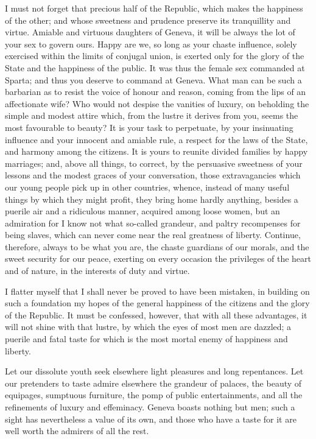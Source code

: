 \documentclass[12pt]{report}
\begin{document}
I must not forget that precious half of the Republic, which makes the happiness of the other; and whose sweetness and prudence preserve its tranquillity and virtue. Amiable and virtuous daughters of Geneva, it will be always the lot of your sex to govern ours. Happy are we, so long as your chaste influence, solely exercised within the limits of conjugal union, is exerted only for the glory of the State and the happiness of the public. It was thus the female sex commanded at Sparta; and thus you deserve to command at Geneva. What man can be such a barbarian as to resist the voice of honour and reason, coming from the lips of an affectionate wife? Who would not despise the vanities of luxury, on beholding the simple and modest attire which, from the lustre it derives from you, seems the most favourable to beauty? It is your task to perpetuate, by your insinuating influence and your innocent and amiable rule, a respect for the laws of the State, and harmony among the citizens. It is yours to reunite divided families by happy marriages; and, above all things, to correct, by the persuasive sweetness of your lessons and the modest graces of your conversation, those extravagancies which our young people pick up in other countries, whence, instead of many useful things by which they might profit, they bring home hardly anything, besides a puerile air and a ridiculous manner, acquired among loose women, but an admiration for I know not what so-called grandeur, and paltry recompenses for being slaves, which can never come near the real greatness of liberty. Continue, therefore, always to be what you are, the chaste guardians of our morals, and the sweet security for our peace, exerting on every occasion the privileges of the heart and of nature, in the interests of duty and virtue.

I flatter myself that I shall never be proved to have been mistaken, in building on such a foundation my hopes of the general happiness of the citizens and the glory of the Republic. It must be confessed, however, that with all these advantages, it will not shine with that lustre, by which the eyes of most men are dazzled; a puerile and fatal taste for which is the most mortal enemy of happiness and liberty.

Let our dissolute youth seek elsewhere light pleasures and long repentances. Let our pretenders to taste admire elsewhere the grandeur of palaces, the beauty of equipages, sumptuous furniture, the pomp of public entertainments, and all the refinements of luxury and effeminacy. Geneva boasts nothing but men; such a sight has nevertheless a value of its own, and those who have a taste for it are well worth the admirers of all the rest.
\end{document}
